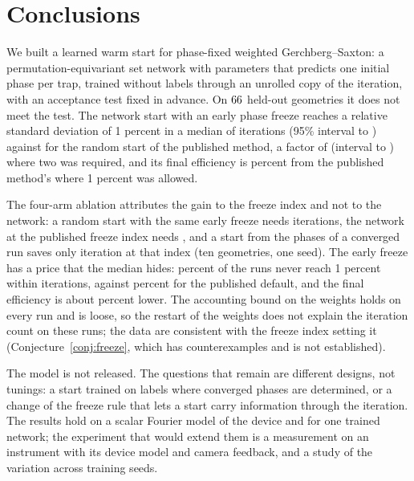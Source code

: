 \section{Conclusions}\label{sec:conclusions}

We built a learned warm start for phase-fixed weighted Gerchberg--Saxton: a permutation-equivariant set network with \nParams{} parameters that predicts one initial phase per trap, trained without labels through an unrolled copy of the iteration, with an acceptance test fixed in advance. On $66$ held-out geometries it does not meet the test. The network start with an early phase freeze reaches a relative standard deviation of 1 percent in a median of \itNThree{} iterations (95\% interval \itNThreeLo{} to \itNThreeHi) against \itRTwelve{} for the random start of the published method, a factor of \ratioRoverN{} (interval \ratioRoverNLo{} to \ratioRoverNHi) where two was required,
and its final efficiency is \effdNThree{} percent from the published method's where 1 percent was allowed.

The four-arm ablation attributes the gain to the freeze index and not to the network: a random start with the same early freeze needs \itRThree{} iterations, the network at the published freeze index needs \itNTwelve{}, and a start from the phases of a converged run saves only \OTwelveGain{} iteration at that index (ten geometries, one seed). The early freeze has a price that the median hides: \neverRThree{} percent of the runs never reach 1 percent within \budget{} iterations, against \neverRTwelve{} percent for the published default, and the final efficiency is about \effdRThree{} percent lower. The accounting bound on the weights holds on every run and is loose, so the restart of the weights does not explain the iteration count on these runs; the data are consistent with the freeze index setting it (Conjecture~\ref{conj:freeze}, which has counterexamples and is not established).

The model is not released. The questions that remain are different designs, not tunings: a start trained on labels where converged phases are determined, or a change of the freeze rule that lets a start carry information through the iteration. The results hold on a scalar Fourier model of the device and for one trained network; the experiment that would extend them is a measurement on an instrument with its device model and camera feedback, and a study of the variation across training seeds.
